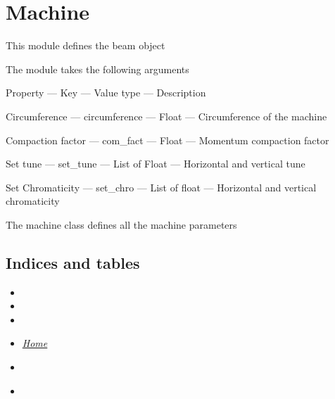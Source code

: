 \documentclass[letterpaper,10pt,english]{sphinxmanual}
\begin{document}
\section{Machine}
\label{machine::doc}\label{machine:machine}\label{machine:module-machine}
This module defines the beam object

The module takes the following arguments

Property --- Key --- Value type --- Description

Circumference --- circumference --- Float --- Circumference of the machine

Compaction factor --- com\_fact --- Float --- Momentum compaction factor

Set tune --- set\_tune --- List of Float --- Horizontal and vertical tune

Set Chromaticity --- set\_chro --- List of float --- Horizontal and vertical chromaticity

\begin{fulllineitems}
\label{machine:machine.machine}
The machine class defines all the machine parameters

\end{fulllineitems}



\subsection{Indices and tables}
\label{machine:indices-and-tables}\begin{itemize}
\item {} 

\item {} 

\item {} 

\item {} 
{\hyperref[index::doc]{\emph{\emph{Home}}}}

\item {} 
{\hyperref[index:index-label]{\emph{}}}

\item {} 
{\hyperref[beam:beam-label]{\emph{}}}

\end{itemize}
\end{document}
